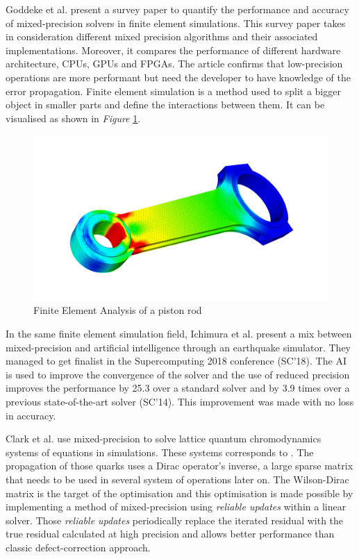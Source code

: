Goddeke et al. \cite{Goddeke2007} present a survey paper to quantify the performance and accuracy of mixed-precision solvers in finite element simulations. This survey paper takes in consideration different mixed precision algorithms and their associated implementations. Moreover, it compares the performance of different hardware architecture, CPUs, GPUs and FPGAs. The article confirms that low-precision operations are more performant but need the developer to have knowledge of the error propagation. Finite element simulation is a method used to split a bigger object in smaller parts and define the interactions between them. It can be visualised as shown in \emph{Figure} \ref{fig:FESim}.

\begin{figure}[htbp]
	\centering
		\includegraphics[width=.5\textwidth]{Figures/FESim.png}
	\caption[Finite Element Simulation]{Finite Element Analysis of a piston rod \cite{Simscale}}
	\label{fig:FESim}
\end{figure}

In the same finite element simulation field, Ichimura et al. \cite{Ichimura2018} present a mix between mixed-precision and artificial intelligence through an earthquake simulator. They managed to get finalist in the Supercomputing 2018 conference (SC'18). The AI is used to improve the convergence of the solver and the use of reduced precision improves the performance by 25.3 over a standard solver and by 3.9 times over a previous state-of-the-art solver (SC'14). This improvement was made with no loss in accuracy.


Clark et al. \cite{Clark2010} use mixed-precision to solve lattice quantum chromodynamics systems of equations in simulations. These systems corresponds to . The propagation of those quarks uses a Dirac operator's inverse, a large sparse matrix that needs to be used in several system of operations later on. The Wilson-Dirac matrix is the target of the optimisation and this optimisation is made possible by implementing a method of mixed-precision using \emph{reliable updates} within a linear solver. Those \emph{reliable updates} periodically replace the iterated residual with the true residual calculated at high precision and allows better performance than classic defect-correction approach.

